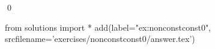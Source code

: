 
\begin{ex} 
  \label{ex:nonconstconst0}
  
  \qed
\end{ex} 
\begin{python0}
from solutions import *
add(label="ex:nonconstconst0",
    srcfilename='exercises/nonconstconst0/answer.tex') 
\end{python0}
